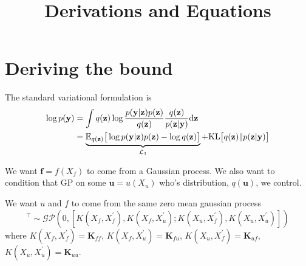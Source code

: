 \documentclass[12pt]{article}
\title{\textbf{Derivations and Equations}}
\date{}
\newcommand{\ub}{\mathbf{u}}
\newcommand{\zb}{\mathbf{z}}
\newcommand{\fb}{\mathbf{f}}
\newcommand{\yb}{\mathbf{y}}
\newcommand{\dd}{\mathrm{d}}
\newcommand{\Lo}{\mathcal{L}_1}
\newcommand{\Kff}{\mathbf{K}_{ff}}
\newcommand{\Kuu}{\mathbf{K}_{uu}}
\newcommand{\Kuf}{\mathbf{K}_{uf}}
\newcommand{\Kfu}{\mathbf{K}_{fu}}
\newcommand{\KL}{\mathrm{KL}}
\begin{document}
\maketitle


\section{Deriving the bound} %
\label{sec:derive_bound}
The standard variational formulation is
%
\begin{align}
    \log p(\yb) &= \int q(\zb)\log\frac{p(\yb|\zb)p(\zb)}{q(\zb)}\frac{q(\zb)}{p(\zb|\yb)} \dd\zb\notag\\
    &= \underbrace{\mathbb{E}_{q(\zb)}\big[ \log p(\yb|\zb)p(\zb) - \log q(\zb) \big]}_{\Lo} + \KL\big[ q(\zb)\Vert p(\zb|\yb) \big]\label{eq:logpy1}
\end{align}

We want $\fb = f(X_f)$ to come from a Gaussian process. We also want to condition that GP on some $\ub=u(X_u)$ who's distribution, $q(\ub)$, we control.

We want $u$ and $f$ to come from the same zero mean gaussian process
%
\begin{equation}
    [f(X_f),u(X_u)]^\top \sim \mathcal{GP}(0,[K(X_f,X_f^\prime),K(X_f,X_u^\prime);K(X_u,X_f^\prime),K(X_u,X_u^\prime)])
\end{equation}
%
where $K(X_f,X_f^\prime) = \Kff$, $K(X_f,X_u^\prime) = \Kfu$, $ K(X_u,X_f^\prime) = \Kuf$, $K(X_u,X_u^\prime) = \Kuu$.
\end{document}
